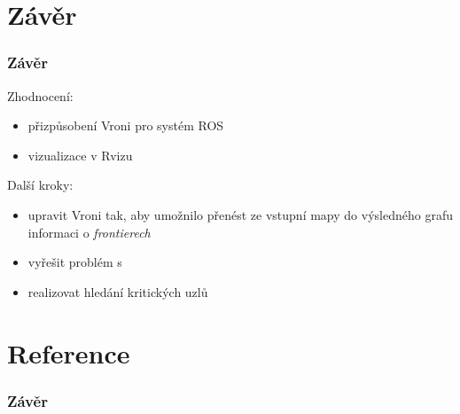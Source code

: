 \documentclass[notes=false,pdftex]{beamer}
\begin{document}
\section{Závěr}
\begin{frame}
	\frametitle{Závěr}

	\begin{block}{Zhodnocení:}
		\begin{itemize}
			\item přizpůsobení Vroni pro systém ROS
			\item vizualizace v Rvizu
		\end{itemize}
	\end{block}
	\begin{block}{Další kroky:}
		\begin{itemize}
			\item upravit Vroni tak, aby umožnilo přenést ze vstupní mapy
				do výsledného grafu informaci o \emph{frontierech}
			\item vyřešit problém s 
			\item realizovat hledání kritických uzlů
		\end{itemize}
	\end{block}

\end{frame}

\section{Reference}
\begin{frame}
	\frametitle{Závěr}

	
	
	
\end{frame}

\end{document}
